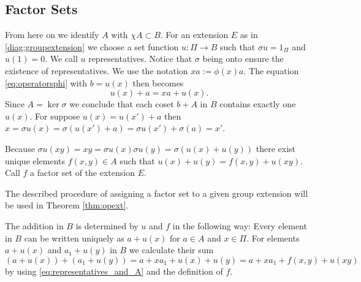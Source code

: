 \subsection{Factor Sets} 
\label{ss:factorsets}
From here on we identify $A$ with $\chi A \subset B$.
For an extension $E$ as in \eqref{diag:groupextension} we choose a set function
$u:\Pi \to B$ such that $\sigma u = 1_{\Pi}$ and $u(1)=0$.
We call $u$ representatives.
Notice that $\sigma$ being onto ensure the existence of representatives.
We use the notation $xa:=\phi(x)a$.
The equation \eqref{eq:operatorsphi} with $b=u(x)$ then becomes
\begin{equation}
\label{eq:representatives_and_A}
u(x) + a = xa + u(x).
\end{equation}
Since $A = \ker\sigma$ we conclude that each coset $b + A$ in $B$ contains exactly one $u(x)$.
For suppose $u(x) = u(x') + a$ then $x = \sigma u (x) = \sigma (u(x')+ a) = \sigma u(x') + \sigma(a) = x'$.

Because $\sigma u (xy) = xy = \sigma u(x) \sigma u(y) = \sigma (u(x)+u(y))$ there exist unique elements $f(x,y)\in A$ such that $u(x) + u(y) = f(x,y) + u(xy)$.
Call $f$ a factor set of the extension $E$.

The described procedure of assigning a factor set to a given group extension will be used in Theorem \ref{thm:opext}.

The addition in $B$ is determined by $u$ and $f$ in the following way:
Every element in $B$ can be written uniquely as $a + u(x)$ for $a\in A$ and $x \in \Pi$.
For elements $a + u(x)$ and $a_1 + u(y)$ in $B$ we calculate their sum
\begin{equation*}
(a + u(x)) + (a_1 + u(y)) = a + x a_1 + u(x) + u(y) = a + x a_1 + f(x,y) + u(xy)
\end{equation*}
by using \eqref{eq:representatives_and_A} and the definition of $f$.




